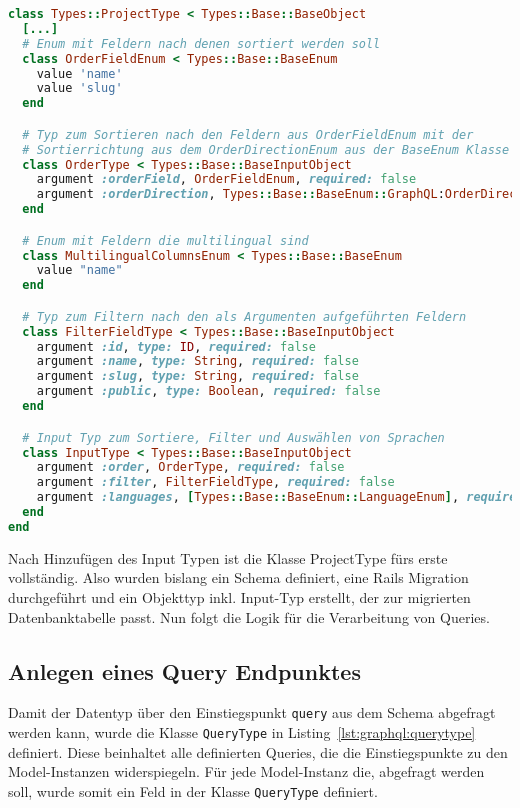 \begin{lstlisting}[language=Ruby,float=h!,caption={Definition der Input Typen in \lstinline|/graphql/types/project_type.rb|}, label={lst:graphql:inputtype}]
class Types::ProjectType < Types::Base::BaseObject
  [...]
  # Enum mit Feldern nach denen sortiert werden soll 
  class OrderFieldEnum < Types::Base::BaseEnum
    value 'name'
    value 'slug'
  end

  # Typ zum Sortieren nach den Feldern aus OrderFieldEnum mit der
  # Sortierrichtung aus dem OrderDirectionEnum aus der BaseEnum Klasse
  class OrderType < Types::Base::BaseInputObject
    argument :orderField, OrderFieldEnum, required: false
    argument :orderDirection, Types::Base::BaseEnum::GraphQL:OrderDirectionEnum, required: false
  end

  # Enum mit Feldern die multilingual sind
  class MultilingualColumnsEnum < Types::Base::BaseEnum
    value "name"
  end

  # Typ zum Filtern nach den als Argumenten aufgeführten Feldern
  class FilterFieldType < Types::Base::BaseInputObject
    argument :id, type: ID, required: false
    argument :name, type: String, required: false
    argument :slug, type: String, required: false
    argument :public, type: Boolean, required: false
  end

  # Input Typ zum Sortiere, Filter und Auswählen von Sprachen
  class InputType < Types::Base::BaseInputObject
    argument :order, OrderType, required: false
    argument :filter, FilterFieldType, required: false
    argument :languages, [Types::Base::BaseEnum::LanguageEnum], required: false
  end
end
\end{lstlisting}

Nach Hinzufügen des Input Typen ist die Klasse ProjectType fürs erste vollständig.
Also wurden bislang ein Schema definiert, eine Rails Migration durchgeführt und ein Objekttyp inkl. Input-Typ erstellt, der zur migrierten Datenbanktabelle passt. Nun folgt die Logik für die Verarbeitung von Queries.


\subsection{Anlegen eines Query Endpunktes}
\label{impl:graphql:querytype}
Damit der Datentyp über den Einstiegspunkt \texttt{query} aus dem Schema abgefragt werden kann, wurde die Klasse \texttt{QueryType} in Listing~\ref{lst:graphql:querytype} definiert.
Diese beinhaltet alle definierten Queries, die die Einstiegspunkte zu den Model-Instanzen widerspiegeln. Für jede Model-Instanz die, abgefragt werden soll, wurde somit ein Feld in der Klasse \texttt{QueryType} definiert.

